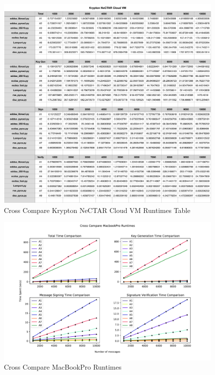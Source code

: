 \documentclass[10pt,sigconf]{acmart}
\begin{document}
\begin{figure}
\centering
\includegraphics[scale=0.5]{Cross_Compare_Krypton_Runtimes}
\caption{\small{Cross Compare Krypton NeCTAR Cloud VM Runtimes Table}}
\label{fig:Cross_Compare_Krypton_Runtimes}
\end{figure}

\begin{figure}
\centering
\includegraphics[scale=0.6]{Cross_Compare_MacBookPro_Runtimes_Graph}
\caption{\small{Cross Compare MacBookPro Runtimes}}
\label{fig:Cross_Compare_MacBookPro_Runtimes_Graph}
\end{figure}
\end{document}

